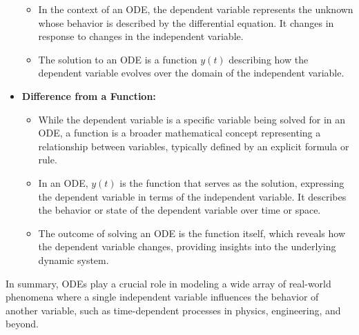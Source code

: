 \begin{airesult}
\begin{itemize}
\begin{itemize}
  \item In the context of an ODE, the dependent variable represents the unknown whose behavior is
described by the differential equation. It changes in response to changes in the independent
variable.

  \item The solution to an ODE is a function \( y(t) \) describing how the dependent variable
evolves over the domain of the independent variable.

  \end{itemize}

\item \textbf{Difference from a Function:}

  \begin{itemize}
  \item While the dependent variable is a specific variable being solved for in an ODE, a function
is a broader mathematical concept representing a relationship between variables, typically defined
by an explicit formula or rule.

  \item In an ODE, \( y(t) \) is the function that serves as the solution, expressing the dependent
variable in terms of the independent variable. It describes the behavior or state of the dependent
variable over time or space.

  \item The outcome of solving an ODE is the function itself, which reveals how the dependent
variable changes, providing insights into the underlying dynamic system.

  \end{itemize}

\end{itemize}

\vsp

In summary, ODEs play a crucial role in modeling a wide array of real-world phenomena where a single
independent variable influences the behavior of another variable, such as time-dependent processes
in physics, engineering, and beyond.
\end{airesult}
